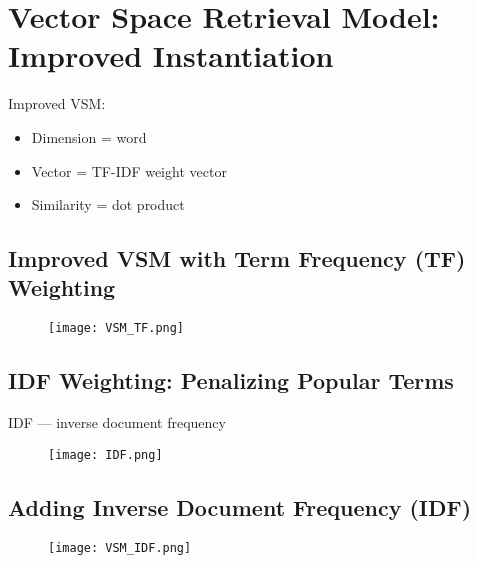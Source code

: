 \section{Vector Space Retrieval Model: Improved Instantiation}

Improved VSM:
\begin{itemize}
\item Dimension = word
\item Vector = TF-IDF weight vector
\item Similarity = dot product
\end{itemize}

\subsection{Improved VSM with Term Frequency (TF) Weighting}
\begin{figure}[H]
    \centering
    \texttt{[image: VSM\_TF.png]}
\end{figure}


\subsection{IDF Weighting: Penalizing Popular Terms}
IDF — inverse document frequency
\begin{figure}[H]
    \centering
    \texttt{[image: IDF.png]}
\end{figure}


\subsection{Adding Inverse Document Frequency (IDF)}
\begin{figure}[H]
    \centering
    \texttt{[image: VSM\_IDF.png]}
\end{figure}

